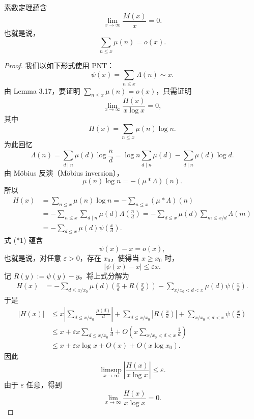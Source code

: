 \begin{theorem}[原文 Theorem 3.18]
	素数定理蕴含
	\[
		\lim_{x\to\infty}\frac{M(x)}x=0.
	\]
	也就是说，
	\[
		\sum_{n\leq x}\mu(n)=o(x).
	\]
\end{theorem}

\begin{proof}
	我们以如下形式使用 PNT：
	\begin{equation}
		\psi(x)=\sum_{n\leq x}\Lambda(n)\sim x. \tag{*1}
	\end{equation}
	由 Lemma 3.17，要证明 $\sum_{n\leq x}\mu(n)=o(x)$，只需证明
	\[
		\lim_{x\to\infty}\frac{H(x)}{x\log x}=0,
	\]
	其中
	\[
		H(x)=\sum_{n\leq x}\mu(n)\log n.
	\]
	为此回忆
	\[
		\Lambda(n)
		=
		\sum_{d\mid n}\mu(d)\log\frac nd
		=
		\log n\sum_{d\mid n}\mu(d)
		-
		\sum_{d\mid n}\mu(d)\log d.
	\]
	由 Möbius 反演（Möbius inversion），
	\[
		\mu(n)\log n=-(\mu*\Lambda)(n).
	\]
	所以
	\[
	\begin{aligned}
		H(x)
		&=
		\sum_{n\leq x}\mu(n)\log n
		=
		-\sum_{n\leq x}(\mu*\Lambda)(n)\\
		&=
		-\sum_{n\leq x}\sum_{d\mid n}\mu(d)\Lambda\left(\frac nd\right)
		=
		-\sum_{d\leq x}\mu(d)\sum_{m\leq x/d}\Lambda(m)\\
		&=
		-\sum_{d\leq x}\mu(d)\psi\left(\frac xd\right).
	\end{aligned}
	\]
	式 (*1) 蕴含
	\[
		\psi(x)-x=o(x),
	\]
	也就是说，对任意 $\varepsilon>0$，存在 $x_0$，使得当 $x\geq x_0$ 时，
	\[
		|\psi(x)-x|\leq \varepsilon x.
	\]
	记 $R(y):=\psi(y)-y$。将上式分解为
	\[
	\begin{aligned}
		H(x)
		&=
		-\sum_{d\leq x/x_0}\mu(d)\left(\frac xd+R\left(\frac xd\right)\right)
		-\sum_{x/x_0<d<x}\mu(d)\psi\left(\frac xd\right).
	\end{aligned}
	\]
	于是
	\[
	\begin{aligned}
		|H(x)|
		&\leq
		x\left|\sum_{d\leq x/x_0}\frac{\mu(d)}d\right|
		+
		\sum_{d\leq x/x_0}\left|R\left(\frac xd\right)\right|
		+
		\sum_{x/x_0<d<x}\psi\left(\frac xd\right)\\
		&\leq
		x+\varepsilon x\sum_{d\leq x/x_0}\frac1d
		+
		O\left(x\sum_{x/x_0<d<x}\frac1d\right)\\
		&\leq
		x+\varepsilon x\log x+O(x)+O(x\log x_0).
	\end{aligned}
	\]
	因此
	\[
		\limsup_{x\to\infty}
		\left|\frac{H(x)}{x\log x}\right|
		\leq
		\varepsilon.
	\]
	由于 $\varepsilon$ 任意，得到
	\[
		\lim_{x\to\infty}\frac{H(x)}{x\log x}=0.
	\]
\end{proof}

